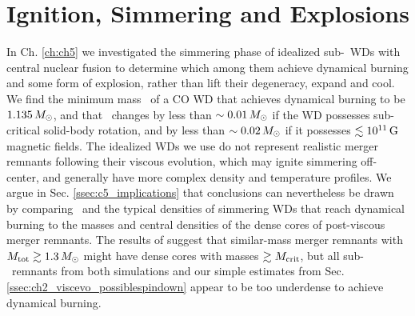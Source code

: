 
\section{Ignition, Simmering and Explosions}


In Ch. \ref{ch:ch5} we investigated the simmering phase of idealized sub-\Mch\ WDs with central nuclear fusion to determine which among them achieve dynamical burning and some form of explosion, rather than lift their degeneracy, expand and cool.  We find the minimum mass \Mcrit\ of a CO WD that achieves dynamical burning to be $1.135\,\Msun$, and that \Mcrit\ changes by less than $\sim0.01\,\Msun$ if the WD possesses sub-critical solid-body rotation, and by less than $\sim0.02\,\Msun$ if it possesses $\lesssim 10^{11}\,\mathrm{G}$ magnetic fields.  The idealized WDs we use do not represent realistic merger remnants following their viscous evolution, which may ignite simmering off-center, and generally have more complex density and temperature profiles.  We argue in Sec. \ref{ssec:c5_implications} that conclusions can nevertheless be drawn by comparing \Mcrit\ and the typical densities of simmering WDs that reach dynamical burning to the masses and central densities of the dense cores of post-viscous merger remnants.  The results of \cite{ji+13} suggest that similar-mass merger remnants with $\Mtot \gtrsim 1.3\,\Msun$ might have dense cores with masses $\gtrsim\Mcrit$, but all sub-\Mch\ remnants from both simulations and our simple estimates from Sec. \ref{ssec:ch2_viscevo_possiblespindown} appear to be too underdense to achieve dynamical burning.  

